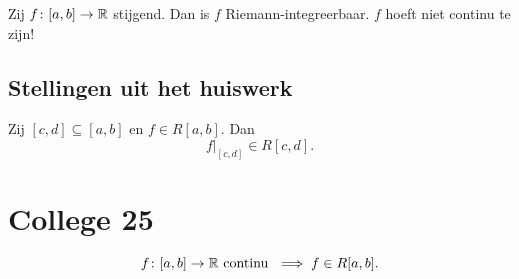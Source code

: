 \documentclass{2wa40summary}
\begin{document}
			\begin{theorem}
				Zij $ f\colon [a,b] \to \mathbb{R} $ stijgend. Dan is $f$ Riemann-integreerbaar.
				\opm $f$ hoeft niet continu te zijn!
			\end{theorem}
			
		\subsection{Stellingen uit het huiswerk}
			\begin{theorem}
				Zij $ [c,d] \subseteq [a,b] $ en $ f \in R[a,b] $. Dan 
				\[ 
					f|_{[c,d]} \in R[c,d].
				 \]
			\end{theorem}
			
		\newpage
		\section{College 25}
			\begin{theorem}[\text{[K]} 6.2.3]
				\[ 
					f\colon [a,b] \to \mathbb{R} \text{ continu } \implies f \in R[a,b].
				 \]
			\end{theorem}
\end{document}
